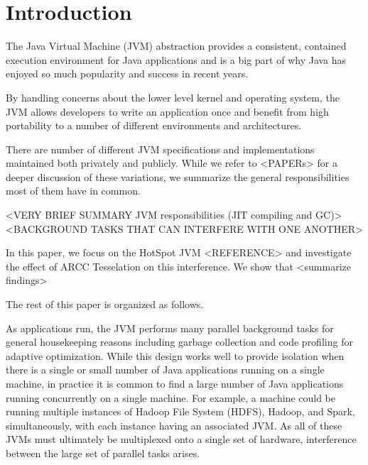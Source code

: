 \documentclass{sig-alternate}
\begin{document}



\section{Introduction}

The Java Virtual Machine (JVM) abstraction provides a consistent, contained execution environment for Java applications and is a big part of why Java has enjoyed so much popularity and success in recent years. 

By handling concerns about the lower level kernel and operating system, the JVM allows developers to write an application once and benefit from high portability to a number of different environments and architectures.

There are number of different JVM specifications and implementations maintained both privately and publicly. While we refer to <PAPERs> for a deeper discussion of these variations, we summarize the general responsibilities most of them have in common.

<VERY BRIEF SUMMARY JVM responsibilities (JIT compiling and GC)>
<BACKGROUND TASKS THAT CAN INTERFERE WITH ONE ANOTHER>

In this paper, we focus on the HotSpot JVM <REFERENCE> and investigate the effect of ARCC  Tesselation on this interference. We show that <summarize findings>

The rest of this paper is organized as follows.


 As applications run, the JVM performs many parallel background tasks for general housekeeping reasons including garbage collection and code profiling for adaptive optimization. While this design works well to provide isolation when there is a single or small number of Java applications running on a single machine, in practice it is common to find a large number of Java applications running concurrently on a single machine. For example, a machine could be running multiple instances of Hadoop File System (HDFS), Hadoop, and Spark, simultaneously, with each instance having an associated JVM. As all of these JVMs must ultimately be multiplexed onto a single set of hardware, interference between the large set of parallel tasks arises.
\end{document}
